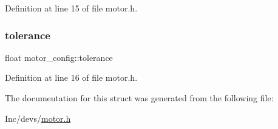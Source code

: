 Definition at line 15 of file motor.\+h.

\mbox{\label{structmotor__config_a65896f970ca53f058d57ec2fc5188719}} 
\subsubsection{\texorpdfstring{tolerance}{tolerance}}
{\footnotesize\ttfamily float motor\+\_\+config\+::tolerance}



Definition at line 16 of file motor.\+h.



The documentation for this struct was generated from the following file\+:\begin{DoxyCompactItemize}
\item 
Inc/devs/\mbox{\hyperlink{motor_8h}{motor.\+h}}\end{DoxyCompactItemize}
